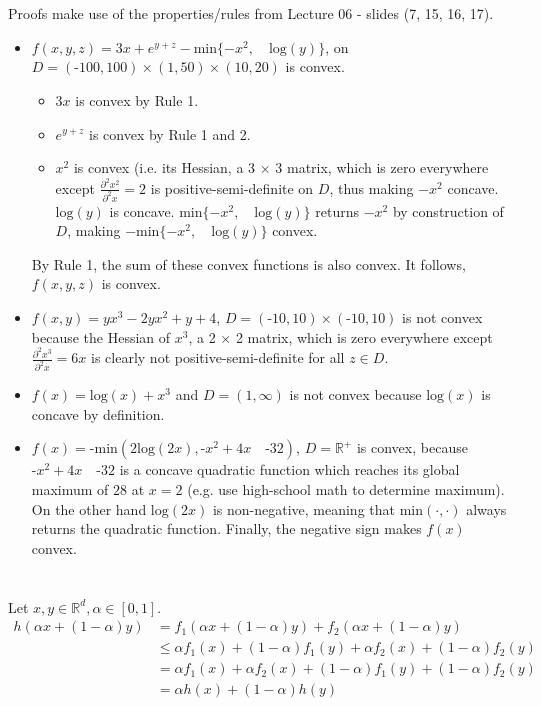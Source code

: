\documentclass[11pt]{article}
\newcommand{\exercise}{\section{}}
\begin{document}
\exercise

Proofs make use of the properties/rules from Lecture 06 - slides (7, 15, 16, 17).
\begin{itemize}
\item $f(x,y,z) = 3x + e^{y + z} - \text{min} \{  -x^2, \quad \text{log}(y) \}$, on $D = ( \text{-}100, 100) \times (1, 50) \times (10, 20) $ is convex.
\begin{itemize}
\item $3x$ is convex by Rule 1.
\item $e^{y + z}$ is convex by Rule 1 and 2.
\item $x^2$ is convex (i.e. its Hessian, a 3 $\times$ 3 matrix, which is zero everywhere except $\frac{\partial^2 x^2}{\partial^2 x} = 2$ is positive-semi-definite on $D$, thus making $-x^2$  concave. $\text{log}(y)$ is concave. $\text{min} \{  -x^2, \quad \text{log}(y) \}$ returns $-x^2$ by construction of $D$, making $- \text{min} \{  -x^2, \quad \text{log}(y) \}$ convex.
\end{itemize}
By Rule 1, the sum of these convex functions is also convex. It follows, $f(x,y,z)$ is convex.
\item $f(x,y) = y x^3 - 2 y x^2 + y + 4$, $D = (\text{-}10, 10) \times (\text{-}10, 10)$ is not convex because the Hessian of $x^3$, a 2 $\times$ 2 matrix, which is zero everywhere except $\frac{\partial^2 x^3}{\partial^2 x} = 6x$ is clearly not positive-semi-definite for all $z \in D$.
\item $f(x) = \text{log}(x) + x^3$ and $D = (1, \infty)$ is not convex because $\text{log}(x)$ is concave by definition.
\item $f(x) = \text{-min}(2 \text{log}(2x), \text{-}x^2 + 4x \quad \text{-} 32)$, $D = \mathbb{R}^+$ is convex, because $\text{-}x^2 + 4x \quad \text{-} 32$ is a concave quadratic function which reaches its global maximum of $28$ at $x = 2$ (e.g. use high-school math to determine maximum). On the other hand $ \text{log}(2x)$ is non-negative, meaning that $\text{min}(\cdot, \cdot)$ always returns the quadratic function. Finally, the negative sign makes $f(x)$ convex.
\end{itemize}

\exercise
Let $x, y \in \mathbb{R}^d, \alpha \in [0, 1]$.
\begin{align*}
h( \alpha x + (1 - \alpha) y ) &= f_1( \alpha x + (1 - \alpha) y ) + f_2( \alpha x + (1 - \alpha) y ) \tag{by def.} \\
&\le \alpha f_1(x) + (1 - \alpha) f_1(y) + \alpha f_2(x) + (1 - \alpha) f_2(y) \tag{by convexity of $f_1, f_2$}  \\
&= \alpha f_1(x) + \alpha f_2(x) + (1 - \alpha) f_1(y) + (1 - \alpha) f_2(y) \\
&= \alpha h(x) + (1 - \alpha) h(y)
\end{align*}
\end{document}
